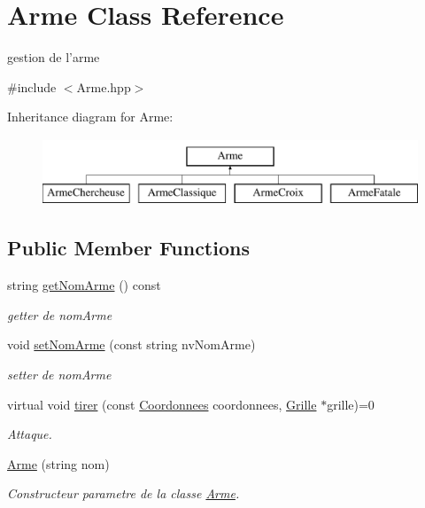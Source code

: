 \hypertarget{classArme}{\section{Arme Class Reference}
\label{classArme}
}


gestion de l'arme  




{\ttfamily \#include $<$Arme.\-hpp$>$}

Inheritance diagram for Arme\-:\begin{figure}[H]
\begin{center}
\leavevmode
\includegraphics[height=2.000000cm]{classArme}
\end{center}
\end{figure}
\subsection*{Public Member Functions}
\begin{DoxyCompactItemize}
\item 
string \hyperlink{classArme_a46baac89e7062c4f111c1ee8b26e59df}{get\-Nom\-Arme} () const 
\begin{DoxyCompactList}\small\item\em getter de nom\-Arme \end{DoxyCompactList}\item 
void \hyperlink{classArme_a0aaf1c316ba1aa46768d73de58e059e2}{set\-Nom\-Arme} (const string nv\-Nom\-Arme)
\begin{DoxyCompactList}\small\item\em setter de nom\-Arme \end{DoxyCompactList}\item 
virtual void \hyperlink{classArme_a2092f960c2fb796bea3d9887775fa90e}{tirer} (const \hyperlink{classCoordonnees}{Coordonnees} coordonnees, \hyperlink{classGrille}{Grille} $\ast$grille)=0
\begin{DoxyCompactList}\small\item\em Attaque. \end{DoxyCompactList}\item 
\hyperlink{classArme_a31f873e62d4cc6f9c055ead94147ee77}{Arme} (string nom)
\begin{DoxyCompactList}\small\item\em Constructeur parametre de la classe \hyperlink{classArme}{Arme}. \end{DoxyCompactList}\end{DoxyCompactItemize}


